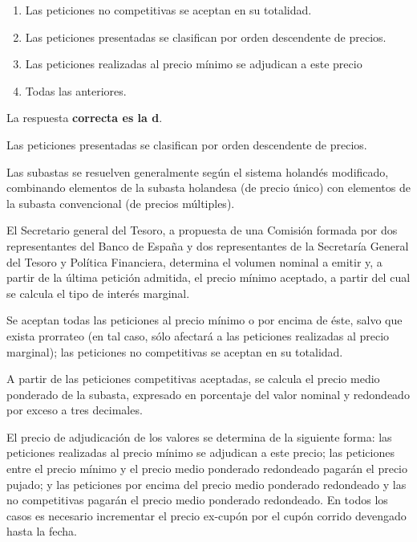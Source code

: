 \documentclass[
  letterpaper,
  DIV=11,
  numbers=noendperiod]{scrreprt}
\begin{document}
\begin{enumerate}
\def\labelenumi{\alph{enumi}.}
\item
  Las peticiones no competitivas se aceptan en su totalidad.
\item
  Las peticiones presentadas se clasifican por orden descendente de
  precios.
\item
  Las peticiones realizadas al precio mínimo se adjudican a este precio
\item
  Todas las anteriores.
\end{enumerate}

\begin{tcolorbox}[enhanced jigsaw, left=2mm, opacityback=0, colback=white, breakable, arc=.35mm, bottomrule=.15mm, rightrule=.15mm, toprule=.15mm, leftrule=.75mm, colframe=quarto-callout-tip-color-frame]
\begin{minipage}[t]{5.5mm}
\textcolor{quarto-callout-tip-color}{\faLightbulb}
\end{minipage}%
\begin{minipage}[t]{\textwidth - 5.5mm}

La respuesta \textbf{correcta es la d}.

Las peticiones presentadas se clasifican por orden descendente de
precios.

Las subastas se resuelven generalmente según el sistema holandés
modificado, combinando elementos de la subasta holandesa (de precio
único) con elementos de la subasta convencional (de precios múltiples).

El Secretario general del Tesoro, a propuesta de una Comisión formada
por dos representantes del Banco de España y dos representantes de la
Secretaría General del Tesoro y Política Financiera, determina el
volumen nominal a emitir y, a partir de la última petición admitida, el
precio mínimo aceptado, a partir del cual se calcula el tipo de interés
marginal.

Se aceptan todas las peticiones al precio mínimo o por encima de éste,
salvo que exista prorrateo (en tal caso, sólo afectará a las peticiones
realizadas al precio marginal); las peticiones no competitivas se
aceptan en su totalidad.

A partir de las peticiones competitivas aceptadas, se calcula el precio
medio ponderado de la subasta, expresado en porcentaje del valor nominal
y redondeado por exceso a tres decimales.

El precio de adjudicación de los valores se determina de la siguiente
forma: las peticiones realizadas al precio mínimo se adjudican a este
precio; las peticiones entre el precio mínimo y el precio medio
ponderado redondeado pagarán el precio pujado; y las peticiones por
encima del precio medio ponderado redondeado y las no competitivas
pagarán el precio medio ponderado redondeado. En todos los casos es
necesario incrementar el precio ex-cupón por el cupón corrido devengado
hasta la fecha.

\end{minipage}%
\end{tcolorbox}
\end{document}
